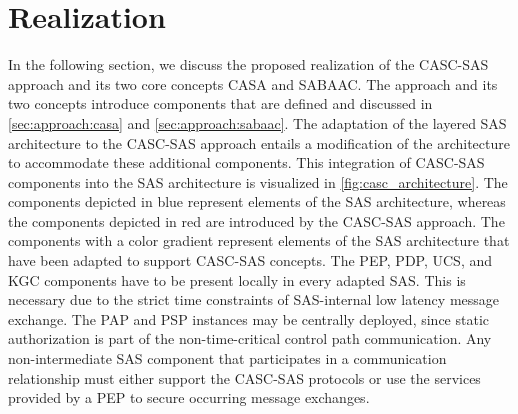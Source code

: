 \section{Realization}
\label{sec:approach:realization}
In the following section, we discuss the proposed realization of the CASC-SAS approach and its two core concepts CASA and SABAAC.
The approach and its two concepts introduce components that are defined and discussed in \autoref{sec:approach:casa} and \autoref{sec:approach:sabaac}.
The adaptation of the layered SAS architecture to the CASC-SAS approach entails a modification of the architecture to accommodate these additional components.
This integration of CASC-SAS components into the SAS architecture is visualized in \autoref{fig:casc_architecture}.
The components depicted in blue represent elements of the SAS architecture, whereas the components depicted in red are introduced by the CASC-SAS approach.
The components with a color gradient represent elements of the SAS architecture that have been adapted to support CASC-SAS concepts.
The PEP, PDP, UCS, and KGC components have to be present locally in every adapted SAS.
This is necessary due to the strict time constraints of SAS-internal low latency message exchange.
The PAP and PSP instances may be centrally deployed, since static authorization is part of the non-time-critical control path communication.
Any non-intermediate SAS component that participates in a communication relationship must either support the CASC-SAS protocols or use the services provided by a PEP to secure occurring message exchanges.
